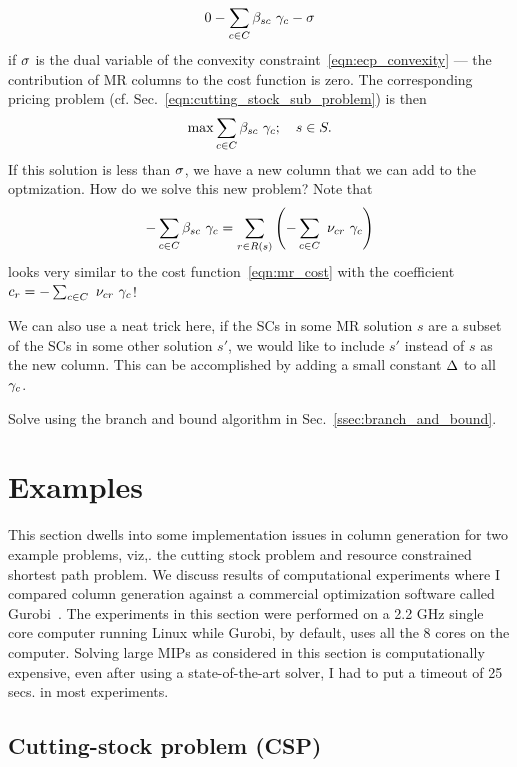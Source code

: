\documentclass[letterpaper, 10pt, twocolumn, reqno]{amsart}
\begin{document}
{\begin{enumerate}[(a)]
            $$
            0 - \sum_{c \in C} \beta_{sc}\ \gamma_c - \sigma
            $$
            if $\sigma$ is the dual variable of the convexity constraint~\eqref{eqn:ecp_convexity} --- the contribution of MR columns to the cost function is zero. The corresponding pricing problem (cf. Sec.~\ref{eqn:cutting_stock_sub_problem}) is then
            $$
            \max \sum_{c \in C} \beta_{sc}\ \gamma_c; \quad s \in S.
            $$
            If this solution is less than $\sigma$, we have a new column that we can add to the optmization. How do we solve this new problem? Note that
            $$
            -\sum_{c \in C} \beta_{sc}\ \gamma_c = \sum_{r \in R(s)} \left(-\sum_{c \in C}\ \nu_{cr}\ \gamma_c\right)
            $$
            looks very similar to the cost function~\eqref{eqn:mr_cost} with the coefficient $c_r = -\sum_{c \in C}\ \nu_{cr}\ \g_c$!

            We can also use a neat trick here, if the SCs in some MR solution $s$ are a subset of the SCs in some other solution $s'$, we would like to include $s'$ instead of $s$ as the new column. This can be accomplished by adding a small constant $\Delta$ to all $\gamma_c$.
        \end{enumerate}

    \item Solve using the branch and bound algorithm in Sec.~\ref{ssec:branch_and_bound}.

}

\section{Examples}
\label{sec:examples}

This section dwells into some implementation issues in column generation for two example problems, viz,. the cutting stock problem and resource constrained
shortest path problem. We discuss results of computational experiments where I compared column generation against a commercial optimization software called
Gurobi~\cite{gurobi}. The experiments in this section were performed on a 2.2 GHz single core computer running Linux while Gurobi, by default, uses all the 8 cores on the computer. Solving large MIPs as considered in this section is computationally expensive, even after using a state-of-the-art solver, I had to put a timeout of 25 secs. in most experiments.

\subsection{Cutting-stock problem (CSP)}
\label{ssec:eg_cutting_stock}
\end{document}
